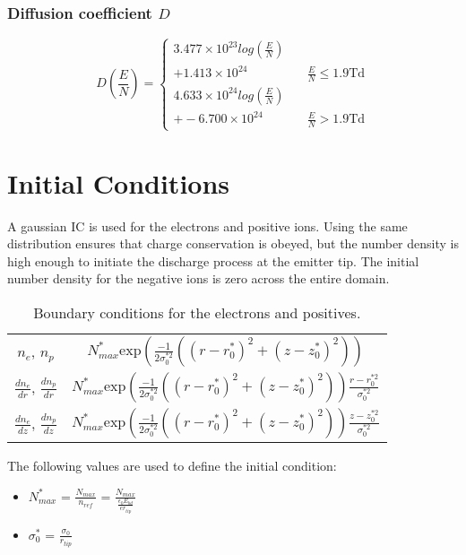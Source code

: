 \documentclass[12pt, a4paper]{report}
\begin{document}
\subsubsection*{Diffusion coefficient $D$}

\begin{equation*}
    D \left( \frac{E}{N} \right) = \left\{
            \begin{array}{ll}
                3.477\times 10^{23}log \left( \frac{E}{N} \right)\\ + 1.413\times 10^{24} & \quad \frac{E}{N} \leq 1.9 \mathrm{Td} \\\hline
                4.633\times 10^{24}log \left( \frac{E}{N} \right)\\ + -6.700\times 10^{24} & \quad \frac{E}{N} > 1.9 \mathrm{Td}
            \end{array}
        \right.
    \end{equation*}

\section{Initial Conditions}
A gaussian IC is used for the electrons and positive ions. Using the same distribution ensures that charge conservation is obeyed, but the number density is high enough to initiate the discharge process at the emitter tip. The initial number density for the negative ions is zero across the entire domain.

\begin{table}[htbp]
    \centering\begin{tabular}{c|c}
        $n_e$, $n_p$ &  $N_{max}^* \mathrm{exp}\left( \frac{-1}{2\sigma_{0}^{*2}} ((r-r_0^{*})^2 + (z-z_0^*)^2) \right)$    \\
        $\frac{dn_e}{dr}$, $\frac{dn_p}{dr}$ &  $N_{max}^* \mathrm{exp}\left( \frac{-1}{2\sigma_{0}^{*2}} ((r-r_0^{*})^2 + (z-z_0^*)^2) \right) \frac{r-r_0^{*2}}{\sigma_{0}^{*2}}$  \\
        $\frac{dn_e}{dz}$, $\frac{dn_p}{dz}$ &  $N_{max}^* \mathrm{exp}\left( \frac{-1}{2\sigma_{0}^{*2}} ((r-r_0^{*})^2 + (z-z_0^*)^2) \right) \frac{z-z_0^{*2}}{\sigma_{0}^{*2}}$  \\
    \end{tabular}
    \caption{Boundary conditions for the electrons and positives.}
    \label{<label>}
\end{table}

The following values are used to define the initial condition:
\begin{itemize}
    \item $N_{max}^*$ = $\frac{N_{max}}{n_{ref}}$ = $\frac{N_{max}}{\frac{\epsilon_0E_{bd}}{e r_{tip}}}$
    \item $\sigma_0^*$ = $\frac{\sigma_0}{r_{tip}}$
\end{itemize}
\end{document}
